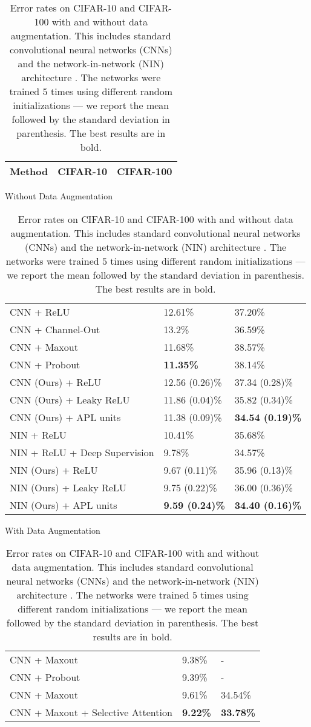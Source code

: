 \documentclass{article} \usepackage{iclr2015,times}
\begin{document}
\begin{table}[h]
\caption{Error rates on CIFAR-10 and CIFAR-100 with and without data augmentation. This includes standard convolutional neural networks (CNNs) and the network-in-network (NIN) architecture \citep{lin2013network}. The networks were trained $5$ times using different random initializations --- we report the mean followed by the standard deviation in parenthesis. The best results are in bold.}
\label{cifar_table}
\begin{center}
\begin{tabular}{p{8.4cm}p{2.2cm}p{2.2cm}}
\bf Method  &\bf CIFAR-10 & \bf CIFAR-100\\
\hline
\end{tabular}
Without Data Augmentation
\begin{tabular}{p{8.4cm}p{2.2cm}p{2.2cm}}
\hline
CNN + ReLU \citep{srivastava2014dropout} & 12.61\% & 37.20\%\\
CNN + Channel-Out \citep{wang2013maxout} & 13.2\% & 36.59\% \\
CNN + Maxout \citep{goodfellow2013maxout} & 11.68\% & 38.57\% \\
CNN + Probout \citep{springenberg2013improving} & \bf11.35\% & 38.14\% \\
CNN (Ours) + ReLU & 12.56 (0.26)\%  & 37.34 (0.28)\%  \\
CNN (Ours) + Leaky ReLU & 11.86 (0.04)\% & 35.82 (0.34)\% \\
CNN (Ours) + APL units  & 11.38 (0.09)\% &\bf34.54 (0.19)\%  \\
\hline
NIN + ReLU \citep{lin2013network} & 10.41\% & 35.68\% \\
NIN + ReLU + Deep Supervision \citep{lee2014deeply} & 9.78\% & 34.57\% \\
NIN (Ours) + ReLU  & 9.67 (0.11)\%   &  35.96 (0.13)\% \\
NIN (Ours) + Leaky ReLU &  9.75 (0.22)\%  &  36.00 (0.36)\%  \\
NIN (Ours) + APL units & \bf9.59 (0.24)\% &  \bf34.40 (0.16)\%   \\
\hline
\end{tabular}
With Data Augmentation
\begin{tabular}{p{8.4cm}p{2.2cm}p{2.2cm}}
\hline
CNN + Maxout \citep{goodfellow2013maxout} & 9.38\% & - \\
CNN + Probout \citep{springenberg2013improving} & 9.39\% & - \\
CNN + Maxout \citep{stollenga2014deep} & 9.61\% & 34.54\% \\
CNN + Maxout + Selective Attention \citep{stollenga2014deep} & \bf9.22\% & \bf33.78\% \\

\end{tabular}
\end{center}
\end{table}
\end{document}
